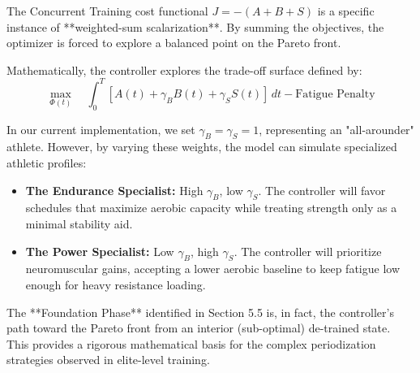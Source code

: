 The Concurrent Training cost functional $J = -(A + B + S)$ is a specific instance of **weighted-sum scalarization**. By summing the objectives, the optimizer is forced to explore a balanced point on the Pareto front.

Mathematically, the controller explores the trade-off surface defined by:
\begin{equation}
    \max_{\Phi(t)} \quad \int_0^T [ A(t) + \gamma_B B(t) + \gamma_S S(t) ] \, dt - \text{Fatigue Penalty}
\end{equation}

In our current implementation, we set $\gamma_B = \gamma_S = 1$, representing an "all-arounder" athlete. However, by varying these weights, the model can simulate specialized athletic profiles:
\begin{itemize}
    \item \textbf{The Endurance Specialist:} High $\gamma_B$, low $\gamma_S$. The controller will favor schedules that maximize aerobic capacity while treating strength only as a minimal stability aid.
    \item \textbf{The Power Specialist:} Low $\gamma_B$, high $\gamma_S$. The controller will prioritize neuromuscular gains, accepting a lower aerobic baseline to keep fatigue low enough for heavy resistance loading.
\end{itemize}

The **Foundation Phase** identified in Section 5.5 is, in fact, the controller's path toward the Pareto front from an interior (sub-optimal) de-trained state. This provides a rigorous mathematical basis for the complex periodization strategies observed in elite-level training.
